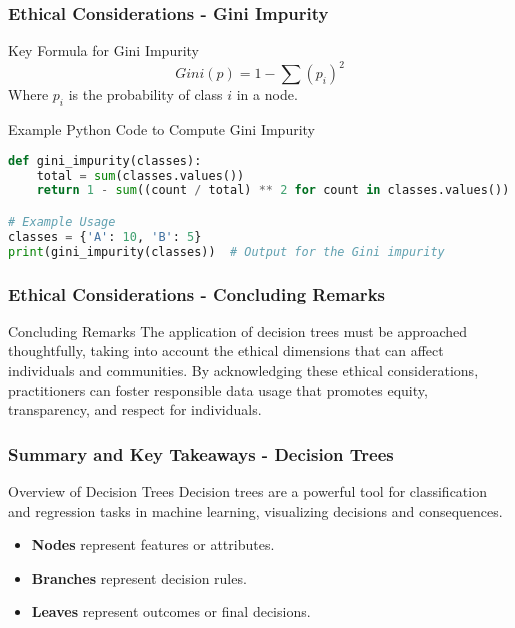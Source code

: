 \documentclass[aspectratio=169]{beamer}
\begin{document}
\begin{frame}[fragile]
    \frametitle{Ethical Considerations - Gini Impurity}
    \begin{block}{Key Formula for Gini Impurity}
        \begin{equation}
            Gini(p) = 1 - \sum (p_i)^2
        \end{equation}
        Where \( p_i \) is the probability of class \( i \) in a node.
    \end{block}

    \begin{block}{Example Python Code to Compute Gini Impurity}
        \begin{lstlisting}[language=Python]
def gini_impurity(classes):
    total = sum(classes.values())
    return 1 - sum((count / total) ** 2 for count in classes.values())

# Example Usage
classes = {'A': 10, 'B': 5}
print(gini_impurity(classes))  # Output for the Gini impurity
        \end{lstlisting}
    \end{block}
\end{frame}

\begin{frame}[fragile]
    \frametitle{Ethical Considerations - Concluding Remarks}
    \begin{block}{Concluding Remarks}
        The application of decision trees must be approached thoughtfully, taking into account the ethical dimensions that can affect individuals and communities. By acknowledging these ethical considerations, practitioners can foster responsible data usage that promotes equity, transparency, and respect for individuals.
    \end{block}
\end{frame}

\begin{frame}[fragile]
    \frametitle{Summary and Key Takeaways - Decision Trees}
    \begin{block}{Overview of Decision Trees}
        Decision trees are a powerful tool for classification and regression tasks in machine learning, visualizing decisions and consequences.
    \end{block}
    
    \begin{itemize}
        \item \textbf{Nodes} represent features or attributes.
        \item \textbf{Branches} represent decision rules.
        \item \textbf{Leaves} represent outcomes or final decisions.
    \end{itemize}
\end{frame}
\end{document}
